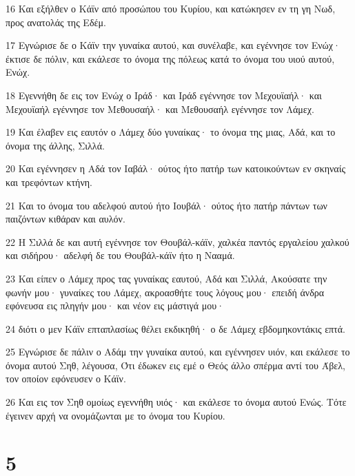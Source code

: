 \par 16 Και εξήλθεν ο Κάϊν από προσώπου του Κυρίου, και κατώκησεν εν τη γη Νωδ, προς ανατολάς της Εδέμ.
\par 17 Εγνώρισε δε ο Κάϊν την γυναίκα αυτού, και συνέλαβε, και εγέννησε τον Ενώχ· έκτισε δε πόλιν, και εκάλεσε το όνομα της πόλεως κατά το όνομα του υιού αυτού, Ενώχ.
\par 18 Εγεννήθη δε εις τον Ενώχ ο Ιράδ· και Ιράδ εγέννησε τον Μεχουϊαήλ· και Μεχουϊαήλ εγέννησε τον Μεθουσαήλ· και Μεθουσαήλ εγέννησε τον Λάμεχ.
\par 19 Και έλαβεν εις εαυτόν ο Λάμεχ δύο γυναίκας· το όνομα της μιας, Αδά, και το όνομα της άλλης, Σιλλά.
\par 20 Και εγέννησεν η Αδά τον Ιαβάλ· ούτος ήτο πατήρ των κατοικούντων εν σκηναίς και τρεφόντων κτήνη.
\par 21 Και το όνομα του αδελφού αυτού ήτο Ιουβάλ· ούτος ήτο πατήρ πάντων των παιζόντων κιθάραν και αυλόν.
\par 22 Η Σιλλά δε και αυτή εγέννησε τον Θουβάλ-κάϊν, χαλκέα παντός εργαλείου χαλκού και σιδήρου· αδελφή δε του Θουβάλ-κάϊν ήτο η Νααμά.
\par 23 Και είπεν ο Λάμεχ προς τας γυναίκας εαυτού, Αδά και Σιλλά, Ακούσατε την φωνήν μου· γυναίκες του Λάμεχ, ακροασθήτε τους λόγους μου· επειδή άνδρα εφόνευσα εις πληγήν μου· και νέον εις μάστιγά μου·
\par 24 διότι ο μεν Κάϊν επταπλασίως θέλει εκδικηθή· ο δε Λάμεχ εβδομηκοντάκις επτά.
\par 25 Εγνώρισε δε πάλιν ο Αδάμ την γυναίκα αυτού, και εγέννησεν υιόν, και εκάλεσε το όνομα αυτού Σηθ, λέγουσα, Ότι έδωκεν εις εμέ ο Θεός άλλο σπέρμα αντί του Άβελ, τον οποίον εφόνευσεν ο Κάϊν.
\par 26 Και εις τον Σηθ ομοίως εγεννήθη υιός· και εκάλεσε το όνομα αυτού Ενώς. Τότε έγεινεν αρχή να ονομάζωνται με το όνομα του Κυρίου.

\chapter{5}

